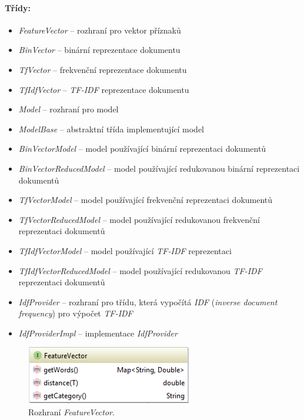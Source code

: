 \documentclass[12pt, a4paper]{report}
\begin{document}
\paragraph{Třídy:}
\begin{itemize}
	\item \emph{FeatureVector} -- rozhraní pro vektor příznaků
	\item \emph{BinVector} -- binární reprezentace dokumentu
	\item \emph{TfVector} -- frekvenční reprezentace dokumentu
	\item \emph{TfIdfVector} -- \emph{TF-IDF} reprezentace dokumentu

	\item \emph{Model} -- rozhraní pro model
	\item \emph{ModelBase} -- abstraktní třída implementující model
	\item \emph{BinVectorModel} -- model používající binární reprezentaci dokumentů
	\item \emph{BinVectorReducedModel} -- model používající redukovanou binární reprezentaci dokumentů
	\item \emph{TfVectorModel} -- model používající frekvenční reprezentaci dokumentů
	\item \emph{TfVectorReducedModel} -- model používající redukovanou frekvenční reprezentaci dokumentů
	\item \emph{TfIdfVectorModel} -- model používající \emph{TF-IDF} reprezentaci
	\item \emph{TfIdfVectorReducedModel} -- model používající redukovanou \emph{TF-IDF} reprezentaci dokumentů

	\item \emph{IdfProvider} -- rozhraní pro třídu, která vypočítá \emph{IDF} (\emph{inverse document frequency}) pro výpočet \emph{TF-IDF}
	\item \emph{IdfProviderImpl} -- implementace \emph{IdfProvider}
\end{itemize}

\begin{figure}[H]
	\centering
	\includegraphics[]{img-fv-i}
	\caption{Rozhraní \emph{FeatureVector}.}
	\label{fig:img-fv-i}
\end{figure}
\end{document}
